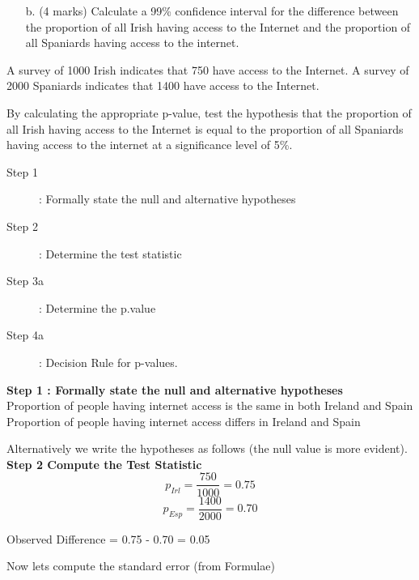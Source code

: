 \documentclass[]{report}
\begin{document}
\begin{enumerate}
\begin{enumerate}
\begin{itemize}
\item[b.] (4 marks) Calculate a 99\% confidence interval for the difference between the proportion of all Irish
having access to the Internet and the proportion of all Spaniards having access to the
internet.
\end{itemize}

A survey of 1000 Irish indicates that 750 have access to the Internet. A survey of 2000 Spaniards indicates that 1400 have access to the Internet.

\noindent By calculating the appropriate p-value, test the hypothesis that the proportion of all Irish having access to the Internet
is equal to the proportion of all Spaniards having access to the internet at a significance level of 5\%. %


\begin{description}
\item[Step 1] : Formally state the null and alternative hypotheses
\item[Step 2] : Determine the test statistic
\item[Step 3a] : Determine the p.value
\item[Step 4a] : Decision Rule for p-values.
\end{description}


\noindent \textbf{Step 1 : Formally state the null and alternative hypotheses}\\ 
Proportion of people having internet access is the same in both Ireland and Spain
Proportion of people having internet access differs in Ireland and Spain


Alternatively we write the hypotheses as follows (the null value is more evident).
\noindent \textbf{Step 2 Compute the Test Statistic}\\

\[p_{Irl}= \frac{750}{1000}= 0.75\] 
\[p_{Esp}= \frac{1400}{2000}= 0.70\]

Observed Difference = 0.75 - 0.70 = 0.05  

Now lets compute the standard error (from Formulae)





\end{enumerate}
\end{enumerate}
\end{document}
